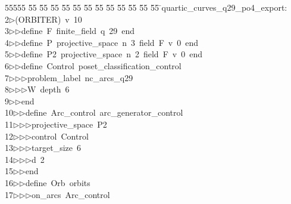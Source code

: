 %
%
\begin{tabbing}
55555 \= 55 \= 55 \= 55 \= 55 \= 55 \= 55 \= 55 \= 55 \= 55 \= 55 \= 55 \= 55 \= \>quartic\_curves\_q29\_po4\_export:\\[0pt]
2\>$\triangleright$\>(ORBITER)\ v\ 10\ \\[0pt]
3\>$\triangleright$\>$\triangleright$\>define\ F\ finite\_field\ q\ 29\ end\ \\[0pt]
4\>$\triangleright$\>$\triangleright$\>define\ P\ projective\_space\ n\ 3\ field\ F\ v\ 0\ end\ \\[0pt]
5\>$\triangleright$\>$\triangleright$\>define\ P2\ projective\_space\ n\ 2\ field\ F\ v\ 0\ end\ \\[0pt]
6\>$\triangleright$\>$\triangleright$\>define\ Control\ poset\_classification\_control\ \\[0pt]
7\>$\triangleright$\>$\triangleright$\>$\triangleright$\>problem\_label\ nc\_arcs\_q29\ \\[0pt]
8\>$\triangleright$\>$\triangleright$\>$\triangleright$\>W\ depth\ 6\ \\[0pt]
9\>$\triangleright$\>$\triangleright$\>end\ \\[0pt]
10\>$\triangleright$\>$\triangleright$\>define\ Arc\_control\ arc\_generator\_control\ \\[0pt]
11\>$\triangleright$\>$\triangleright$\>$\triangleright$\>projective\_space\ P2\ \\[0pt]
12\>$\triangleright$\>$\triangleright$\>$\triangleright$\>control\ Control\ \\[0pt]
13\>$\triangleright$\>$\triangleright$\>$\triangleright$\>target\_size\ 6\ \\[0pt]
14\>$\triangleright$\>$\triangleright$\>$\triangleright$\>d\ 2\ \\[0pt]
15\>$\triangleright$\>$\triangleright$\>end\ \\[0pt]
16\>$\triangleright$\>$\triangleright$\>define\ Orb\ orbits\ \\[0pt]
17\>$\triangleright$\>$\triangleright$\>$\triangleright$\>on\_arcs\ Arc\_control\ \\[0pt]

\end{tabbing}
